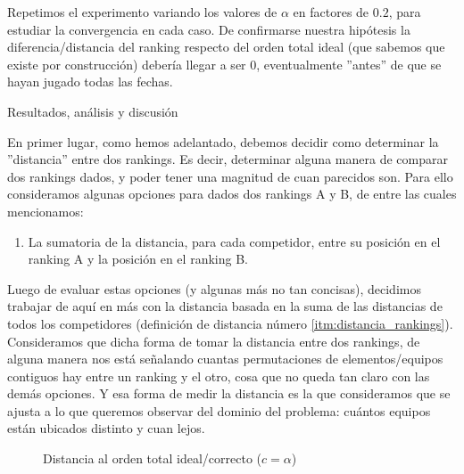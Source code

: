 \begin{LaTeXdescription}
        \par Repetimos el experimento variando los valores de $\alpha$ en
        factores de $0.2$, para estudiar la convergencia en cada caso.  De
        confirmarse nuestra hip\'otesis la diferencia/distancia del ranking
        respecto del orden total ideal (que sabemos que existe por
        construcci\'on) deber\'ia llegar a ser 0, eventualmente ''antes'' de que
        se hayan jugado todas las fechas.\\

    \item[Resultados, an\'alisis y discusi\'on]
\end{LaTeXdescription}

\par En primer lugar, como hemos adelantado, debemos decidir como determinar la
''distancia'' entre dos rankings. Es decir, determinar alguna manera de comparar
dos rankings dados, y poder tener una magnitud de cuan parecidos son. Para ello
consideramos algunas opciones para dados dos rankings A y B, de entre las cuales
mencionamos:

\begin{enumerate}
        \item La sumatoria de la distancia, para cada competidor, entre su
            posici\'on en el ranking A y la posici\'on en el ranking
            B.\label{itm:distancia_rankings}
\end{enumerate}

\par Luego de evaluar estas opciones (y algunas m\'as no tan concisas),
decidimos trabajar de aqu\'i en m\'as con la distancia basada en la suma de las
distancias de todos los competidores (definici\'on de distancia n\'umero
\ref{itm:distancia_rankings}). Consideramos que dicha forma de tomar la
distancia entre dos rankings, de alguna manera nos est\'a se\~nalando cuantas
permutaciones de elementos/equipos contiguos hay entre un ranking y el otro,
cosa que no queda tan claro con las dem\'as opciones. Y esa forma de medir la
distancia es la que consideramos que se ajusta a lo que queremos observar del
dominio del problema: cu\'antos equipos est\'an ubicados distinto y cuan lejos.

\begin{figure}[H]
    \caption{Distancia al orden total ideal/correcto ($c = \alpha$)}
    \label{fig:exp5_1}
    \centering
\end{figure}

